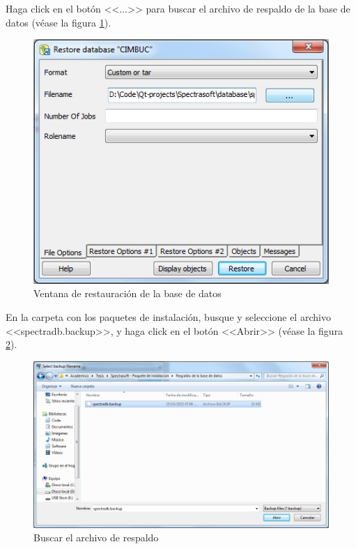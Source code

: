 Haga click en el bot\'{o}n <<...>> para buscar el archivo de respaldo de la base de datos (v\'{e}ase la figura \ref{fig:pgadmin-restaurar-ventana}).
\vfill
\begin{figure}[H]
  \centering
  \includegraphics[width=.6\linewidth]{./img/pgadmin-restaurar-ventana.jpg}
\caption[]{Ventana de restauraci\'{o}n de la base de datos\label{fig:pgadmin-restaurar-ventana}}
\end{figure}
\vfill
En la carpeta con los paquetes de instalaci\'{o}n, busque y seleccione el archivo <<spectradb.backup>>, y haga click en el bot\'{o}n <<Abrir>> (v\'{e}ase la figura \ref{fig:pgadmin-restaurar-buscar}).
\vfill
\begin{figure}[H]
  \centering
  \includegraphics[width=1\linewidth]{./img/pgadmin-restaurar-buscar.jpg}
\caption[]{Buscar el archivo de respaldo\label{fig:pgadmin-restaurar-buscar}}
\end{figure}
\vfill
\newpage


